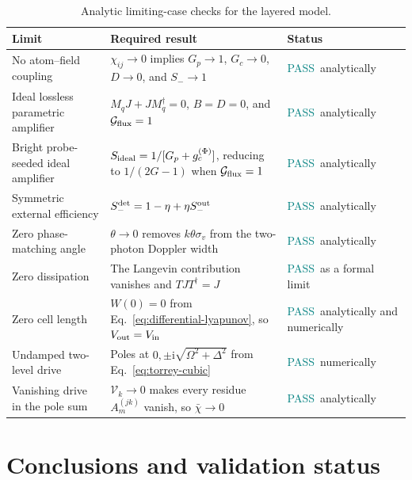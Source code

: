 \documentclass[11pt,a4paper]{article}
\newcommand{\ii}{\mathrm i}
\newcommand{\chibar}{\bar\chi}
\newcommand{\pass}{\textcolor{teal}{PASS}}
\begin{document}
\begin{table}[!ht]
\centering
\caption{Analytic limiting-case checks for the layered model.}
\label{tab:limits}
\small
\begin{tabularx}{\textwidth}{L{3.5cm}Y L{2.2cm}}
\toprule
Limit & Required result & Status\\
\midrule
No atom--field coupling &
$\chi_{ij}\to0$ implies $G_p\to1$, $G_c\to0$, $D\to0$, and $S_-\to1$ &
\pass\ analytically\\
Ideal lossless parametric amplifier &
$M_qJ+JM_q^\dagger=0$, $B=D=0$, and $\mathcal G_{\rm flux}=1$ &
\pass\ analytically\\
Bright probe-seeded ideal amplifier &
$S_{\rm ideal}=1/[G_p+g_c^{(\Phi)}]$, reducing to $1/(2G-1)$ when
$\mathcal G_{\rm flux}=1$ &
\pass\ analytically\\
Symmetric external efficiency &
$S_-^{\rm det}=1-\eta+\eta S_-^{\rm out}$ &
\pass\ analytically\\
Zero phase-matching angle &
$\theta\to0$ removes $k\theta\sigma_v$ from the two-photon Doppler width &
\pass\ analytically\\
Zero dissipation &
The Langevin contribution vanishes and $TJT^\dagger=J$ &
\pass\ as a formal limit\\
Zero cell length &
$W(0)=0$ from Eq.~\eqref{eq:differential-lyapunov}, so
$V_{\rm out}=V_{\rm in}$ &
\pass\ analytically and numerically\\
Undamped two-level drive &
Poles at $0,\pm\ii\sqrt{\Omega^2+\Delta^2}$ from
Eq.~\eqref{eq:torrey-cubic} & \pass\ numerically\\
Vanishing drive in the pole sum &
$\mathcal V_k\to0$ makes every residue $A_m^{(jk)}$ vanish, so
$\chibar\to0$ & \pass\ analytically\\
\bottomrule
\end{tabularx}
\end{table}

\clearpage
\section{Conclusions and validation status}
\end{document}
